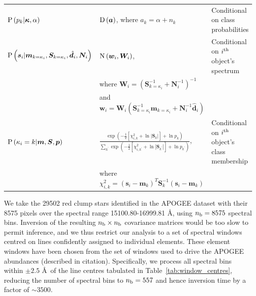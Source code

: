\documentclass[a4paper,fleqn,usenatbib]{mnras}
\newcommand{\nb}{n_{\rm b}}
\newcommand{\prob}{{\rm P}}
\newcommand{\normal}{{\rm{N}}}
\newcommand{\dirichlet}{{\rm D}}
\newcommand{\alphas}{{\bm a}}
\newcommand{\specmean}{{\bm m}}
\newcommand{\speccov}{{\bm S}}
\newcommand{\classprob}{{p}}
\newcommand{\classprobs}{{\bm p}}
\newcommand{\objspec}{{\bm s}}
\newcommand{\objclass}{{\kappa}}
\newcommand{\objclasses}{{\bm \kappa}}
\newcommand{\objdata}{\hat{\bm d}}
\newcommand{\objnoise}{{\bm N}}
\newcommand{\wfmean}{{\bm w}}
\newcommand{\wfcov}{{\bm W}}
\begin{document}
\begin{table}
\begin{tabular}{lll}
        $\prob\left(\classprob_k | \objclasses, \alpha\right)$ & $\dirichlet\left(\alphas\right)$, where $a_k = \alpha + n_k$ & Conditional on class probabilities \\
        $\prob \left( \objspec_i | \specmean_{k=\objclass_i}, \speccov_{k=\objclass_i}, \objdata_i, \objnoise_i \right)$ & $\normal \left( \wfmean_i, \wfcov_i \right)$, & Conditional on $i^{\rm th}$ object's spectrum \\
         & where $\wfcov_i = \left( \speccov_{k=\objclass_i}^{-1} + \objnoise_i^{-1} \right)^{-1}$ &  \\
         & and $\wfmean_i = \wfcov_i \left( \speccov_{k=\objclass_i}^{-1} \specmean_{k=\objclass_i} + \objnoise_i^{-1} \objdata_i \right)$ &  \\
        $\prob \left( \objclass_i = k | \specmean, \speccov, \classprobs \right)$ & $ \frac{ \exp \left( -\frac{1}{2} \left[ \chi^2_{i,k} + \ln \left| \speccov_k \right| \right] + \ln \classprob_k \right) }{ \sum_{k^\prime} \exp \left( -\frac{1}{2} \left[ \chi^2_{i,k^\prime} + \ln \left| \speccov_{k^\prime} \right| \right] + \ln \classprob_{k^\prime} \right) }$, & Conditional on $i^{\rm th}$ object's class membership \\
         & where $\chi^2_{i,k} = \left( \objspec_i - \specmean_k \right)^T \speccov_k^{-1} \left( \objspec_i - \specmean_k \right) $ &  \\
        \hline
    \end{tabular}
\end{table}


We take the 29502 red clump stars identified in the APOGEE dataset with their 8575 pixels over the spectral range 15100.80-16999.81 \AA, using $\nb = 8575$ spectral bins. Inversion of the resulting $\nb \times \nb$ covariance matrices would be too slow to permit inference, and we thus restrict our analysis to a set of spectral windows centred on lines confidently assigned to individual elements. These element windows have been chosen from the set of windows used to drive the APOGEE abundances (described in citation). Specifically, we process all spectral bins within $\pm2.5$ \AA\ of the line centres tabulated in Table~\ref{tab:window_centres}, reducing the number of spectral bins to $\nb = 557$ and hence inversion time by a factor of $\sim3500$.
\end{document}
